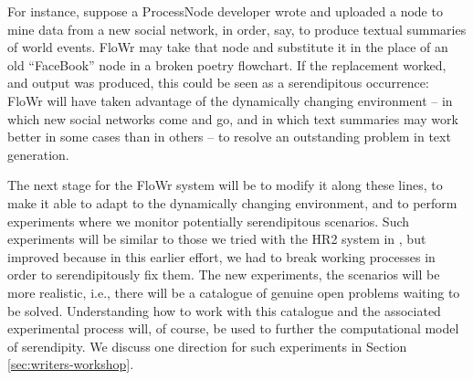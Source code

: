 For instance, suppose a ProcessNode developer wrote and uploaded a
node to mine data from a new social network, in order, say, to produce
textual summaries of world events.  {\sf FloWr} may take that node
and substitute it in the place of an old ``FaceBook'' node in a broken
poetry flowchart. If the replacement worked, and output was produced,
this could be seen as a serendipitous occurrence: {\sf FloWr} will
have taken advantage of the dynamically changing environment -- in
which new social networks come and go, and in which text summaries may
work better in some cases than in others -- to resolve an outstanding
problem in text generation.

The next stage for the {\sf FloWr} system will be to modify it along
these lines, to make it able to adapt to the dynamically changing
environment, and to perform experiments where we monitor potentially
serendipitous scenarios. Such experiments will be similar to those we
tried with the HR2 system in \cite{pease2013discussion}, but improved
because in this earlier effort, we had to break working processes in
order to serendipitously fix them.  The new experiments, the scenarios
will be more realistic, i.e., there will be a catalogue of genuine
open problems waiting to be solved.  Understanding how to work with
this catalogue and the associated experimental process will, of
course, be used to further the computational model of serendipity.  We
discuss one direction for such experiments in Section
\ref{sec:writers-workshop}.
